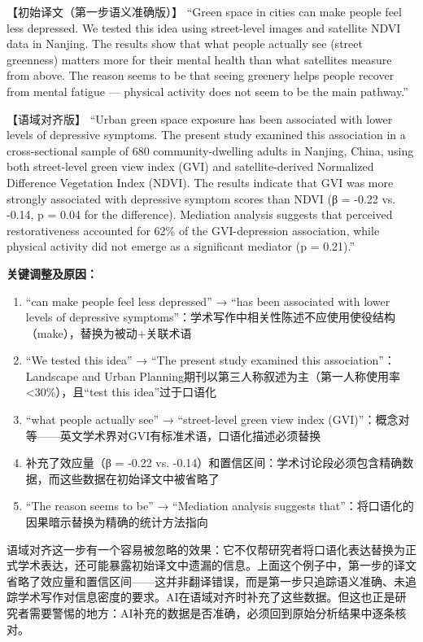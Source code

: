 \begin{aibox}
【初始译文（第一步语义准确版）】
``Green space in cities can make people feel less depressed. We tested this idea using street-level images and satellite NDVI data in Nanjing. The results show that what people actually see (street greenness) matters more for their mental health than what satellites measure from above. The reason seems to be that seeing greenery helps people recover from mental fatigue --- physical activity does not seem to be the main pathway.''

【语域对齐版】
``Urban green space exposure has been associated with lower levels of depressive symptoms. The present study examined this association in a cross-sectional sample of 680 community-dwelling adults in Nanjing, China, using both street-level green view index (GVI) and satellite-derived Normalized Difference Vegetation Index (NDVI). The results indicate that GVI was more strongly associated with depressive symptom scores than NDVI (β = -0.22 vs. -0.14, p = 0.04 for the difference). Mediation analysis suggests that perceived restorativeness accounted for 62\% of the GVI-depression association, while physical activity did not emerge as a significant mediator (p = 0.21).''

\smallskip
\textbf{关键调整及原因：}
\begin{enumerate}[nosep]
\item ``can make people feel less depressed'' → ``has been associated with lower levels of depressive symptoms''：学术写作中相关性陈述不应使用使役结构（make），替换为被动+关联术语
\item ``We tested this idea'' → ``The present study examined this association''：Landscape and Urban Planning期刊以第三人称叙述为主（第一人称使用率<30\%），且``test this idea''过于口语化
\item ``what people actually see'' → ``street-level green view index (GVI)''：概念对等——英文学术界对GVI有标准术语，口语化描述必须替换
\item 补充了效应量（β = -0.22 vs. -0.14）和置信区间：学术讨论段必须包含精确数据，而这些数据在初始译文中被省略了
\item ``The reason seems to be'' → ``Mediation analysis suggests that''：将口语化的因果暗示替换为精确的统计方法指向
\end{enumerate}
\end{aibox}

\begin{critiquebox}
语域对齐这一步有一个容易被忽略的效果：它不仅帮研究者将口语化表达替换为正式学术表达，还可能暴露初始译文中遗漏的信息。上面这个例子中，第一步的译文省略了效应量和置信区间——这并非翻译错误，而是第一步只追踪语义准确、未追踪学术写作对信息密度的要求。AI在语域对齐时补充了这些数据。但这也正是研究者需要警惕的地方：AI补充的数据是否准确，必须回到原始分析结果中逐条核对。
\end{critiquebox}

